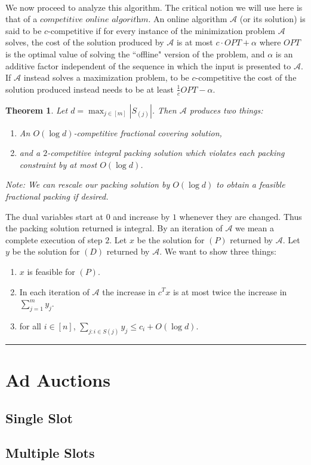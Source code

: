 \documentclass[letterpaper,12pt,oneside,onecolumn]{article}
\newcommand{\cA}{\mathcal{A}} \newcommand{\cB}{\mathcal{B}}
\newenvironment{proof}{{\bf Proof:  }}{\hfill\rule{2mm}{2mm}}
\newtheorem{theorem}[fact]{Theorem}
\begin{document}
\paragraph{}
We now proceed to analyze this algorithm. The critical notion we will use here is that of a $\textit{competitive online algorithm}$. An online algorithm $\cA$ (or its solution) is said to be $c$-competitive if for every instance of the minimization problem $\cA$ solves, the cost of the solution produced by $\cA$ is at most $c\cdot OPT + \alpha$ where $OPT$ is the optimal value of solving the ``offline" version of the problem, and $\alpha$ is an additive factor independent of the sequence in which the input is presented to $\cA$. If $\cA$ instead solves a maximization problem, to be $c$-competitive the cost of the solution produced instead needs to be at least $\frac{1}{c} OPT -\alpha$.
\begin{theorem}\label{th:1}
Let $d = \max_{j \in [m]} |S_(j)|$. Then $\cA$ produces two things:
\begin{enumerate}
\item An $O(\log d)$-competitive fractional covering solution,
\item and a $2$-competitive integral packing solution which violates each packing constraint by at most $O(\log d)$.
\end{enumerate}
Note: We can rescale our packing solution by $O(\log d)$ to obtain a feasible fractional packing if desired.
\end{theorem}
\begin{proof}
The dual variables start at $0$ and increase by $1$ whenever they are changed. Thus the packing solution returned is integral. By an iteration of $\cA$ we mean a complete execution of step $2$. Let $x$ be the solution for $(P)$ returned by $\cA$. Let $y$ be the solution for $(D)$ returned by $\cA$. We want to show three things:
\begin{enumerate}
\item $x$ is feasible for $(P)$.
\item In each iteration of $\cA$ the increase in $c^Tx$ is at most twice the increase in $\sum_{j=1}^m y_j$.
\item for all $i \in [n]$, $\sum_{j : i \in S(j)} y_j \leq c_i + O(\log d)$.
\end{enumerate}

\end{proof}
\section{Ad Auctions}
\subsection{Single Slot}

\subsection{Multiple Slots}


\end{document}
